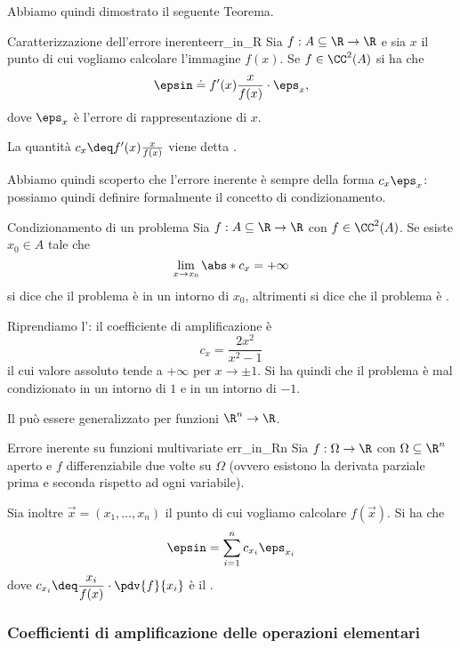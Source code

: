 Abbiamo quindi dimostrato il seguente Teorema.
\begin{theorem}
    {Caratterizzazione dell'errore inerente}{err_in_R}
    Sia $f : A \subseteq \R \to \R$ e sia $x$ il punto di cui vogliamo calcolare l'immagine $f(x)$. Se $f \in \CC^2(A)$ si ha che \[
        \epsin \doteq f'(x)\frac{x}{f(x)} \cdot \eps_x,
    \] dove $\eps_x$ è l'errore di rappresentazione di $x$.

    La quantità $c_x \deq f'(x)\frac{x}{f(x)}$ viene detta .
\end{theorem}

Abbiamo quindi scoperto che l'errore inerente è sempre della forma $c_x\eps_x$: possiamo quindi definire formalmente il concetto di condizionamento.

\begin{definition}{Condizionamento di un problema}{}
    Sia $f : A \subseteq \R \to \R$ con $f \in \CC^2(A)$. Se esiste $x_0 \in A$ tale che \[
        \lim_{x \to x_0} \abs*{c_x} = +\infty
    \] si dice che il problema è  in un intorno di $x_0$, altrimenti si dice che il problema è .
\end{definition}

\begin{example}
    Riprendiamo l': il coefficiente di amplificazione è \[
        c_x = \frac{2x^2}{x^2 - 1}
    \] il cui valore assoluto tende a $+\infty$ per $x \to \pm 1$. Si ha quindi che il problema è mal condizionato in un intorno di $1$ e in un intorno di $-1$.  
\end{example}

Il  può essere generalizzato per funzioni $\R^n \to \R$.
\begin{corollary}
    {Errore inerente su funzioni multivariate}
    {err_in_Rn}
    Sia $f : \Omega \to \R$ con $\Omega \subseteq \R^n$ aperto e $f$ differenziabile due volte su $\Omega$ (ovvero esistono la derivata parziale prima e seconda rispetto ad ogni variabile). 
    
    Sia inoltre $\vec{x} = (x_1, \dots, x_n)$ il punto di cui vogliamo calcolare $f(\vec{x})$. Si ha che \[
        \epsin = \sum_{i=1}^n c_{x_i}\eps_{x_i}
    \] dove $\displaystyle c_{x_i} \deq \frac{x_i}{f(x)} \cdot \pdv{f}{x_i}$ è il . 
\end{corollary}

\subsubsection{Coefficienti di amplificazione delle operazioni elementari}

